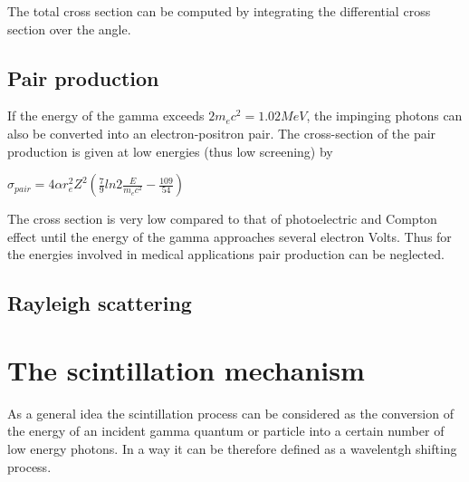 The total cross section can be computed by integrating the differential cross section over the angle.


\subsection{Pair production}


If the energy of the gamma exceeds $2m_{e}c^{2} = 1.02 MeV$, the impinging photons can also be converted into an electron-positron pair. The cross-section of the pair production is given at low energies (thus low screening) by

$\sigma _{pair} = 4\alpha r_{e}^{2} Z^{2} \left( \frac{7}{9}ln2\frac{E}{m_{e}c^{2}} - \frac{109}{54}\right)$

The cross section is very low compared to that of photoelectric and Compton effect until the energy of the gamma approaches several electron Volts. Thus for the energies involved in medical applications pair production can be neglected.

\subsection{Rayleigh scattering}



\section{The scintillation mechanism}
As a general idea the scintillation process can be considered as the conversion of the energy of an incident gamma quantum or particle into a certain number of low energy photons\cite{Rodnyi1997}. In a way it can be therefore defined as a wavelentgh shifting process\cite{Lecoq2006}.

